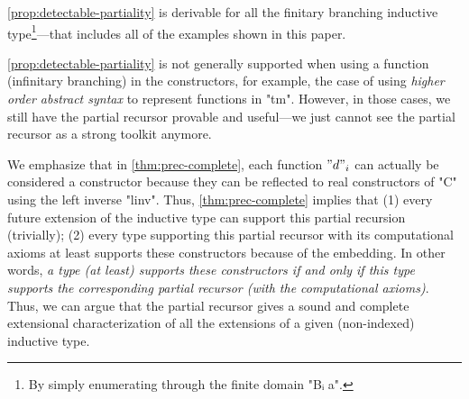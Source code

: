 

\ref{prop:detectable-partiality} is derivable for all the finitary branching inductive type\footnote{By simply enumerating through the finite domain "Bᵢ a".}---that includes all of the examples shown in this paper. 

\ref{prop:detectable-partiality} is not generally supported when using a function (infinitary branching) in the constructors, for example, the case of using \textit{higher order abstract syntax} to represent functions in "tm". However, in those cases, we still have the partial recursor provable and useful---we just cannot see the partial recursor as a strong toolkit anymore.


We emphasize that in \cref{thm:prec-complete}, each function $"d"_i$ can
actually be considered a constructor because they can be reflected
to real constructors of "C" using the left inverse "linv". Thus, \cref{thm:prec-complete}
implies that (1) every future extension of the inductive type can
support this partial recursion (trivially); (2) every type supporting
this partial recursor with its computational axioms at least supports
these constructors because of the embedding. In other words, \textit{a
type (at least) supports these constructors if and only if this type
supports the corresponding partial recursor (with the computational
axioms)}.  Thus, we can argue that the partial recursor gives a sound and
complete extensional characterization of all the extensions of a given (non-indexed)
inductive type.

